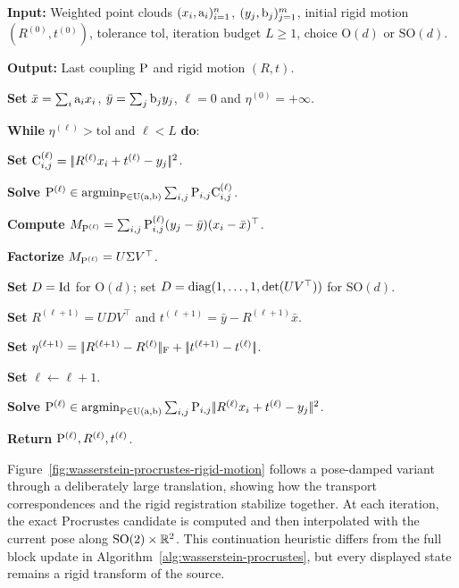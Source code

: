\begin{alg}\label{alg:wasserstein-procrustes}
\textbf{Input:} Weighted point clouds $(x_i,\a_i)_{i=1}^n$, $(y_j,\b_j)_{j=1}^m$, initial rigid motion $(R^{(0)},t^{(0)})$, tolerance $\mathrm{tol}$, iteration budget $L\geq1$, choice $\mathrm O(d)$ or $\mathrm{SO}(d)$.

\textbf{Output:} Last coupling $\P$ and rigid motion $(R,t)$.

\textbf{Set} $\bar x=\sum_i\a_i x_i$, $\bar y=\sum_j\b_j y_j$, $\ell=0$ and $\eta^{(0)}=+\infty$.

\textbf{While} $\eta^{(\ell)}>\mathrm{tol}$ and $\ell<L$ \textbf{do}:
\begin{algblock}

\textbf{Set} \(\C_{i,j}^{(\ell)}=\norm{R^{(\ell)}x_i+t^{(\ell)}-y_j}^2\).

\textbf{Solve} \(\P^{(\ell)}\in\argmin_{\P\in\CouplingsD(\a,\b)}\sum_{i,j}\P_{i,j}\C_{i,j}^{(\ell)}\).

\textbf{Compute} \(M_{\P^{(\ell)}}=\sum_{i,j}\P^{(\ell)}_{i,j}(y_j-\bar y)(x_i-\bar x)^\top\).

\textbf{Factorize} \(M_{\P^{(\ell)}}=U\Sigma V^\top\).

\textbf{Set} \(D=\Id\) for $\mathrm O(d)$; set \(D=\diag(1,\ldots,1,\det(UV^\top))\) for $\mathrm{SO}(d)$.

\textbf{Set} \(R^{(\ell+1)}=UDV^\top\) and \(t^{(\ell+1)}=\bar y-R^{(\ell+1)}\bar x\).

\textbf{Set} \(\eta^{(\ell+1)}=\norm{R^{(\ell+1)}-R^{(\ell)}}_{\mathrm F}+\norm{t^{(\ell+1)}-t^{(\ell)}}\).

\textbf{Set} \(\ell\leftarrow \ell+1\).
\end{algblock}
\algreturnskip
\textbf{Solve} \(\P^{(\ell)}\in\argmin_{\P\in\CouplingsD(\a,\b)}\sum_{i,j}\P_{i,j}\norm{R^{(\ell)}x_i+t^{(\ell)}-y_j}^2\).

\textbf{Return} \(\P^{(\ell)},R^{(\ell)},t^{(\ell)}\).
\end{alg}

Figure~\ref{fig:wasserstein-procrustes-rigid-motion} follows a pose-damped variant through a deliberately large translation, showing how the transport correspondences and the rigid registration stabilize together. At each iteration, the exact Procrustes candidate is computed and then interpolated with the current pose along $\mathrm{SO}(2)\times\RR^2$. This continuation heuristic differs from the full block update in Algorithm~\ref{alg:wasserstein-procrustes}, but every displayed state remains a rigid transform of the source.


